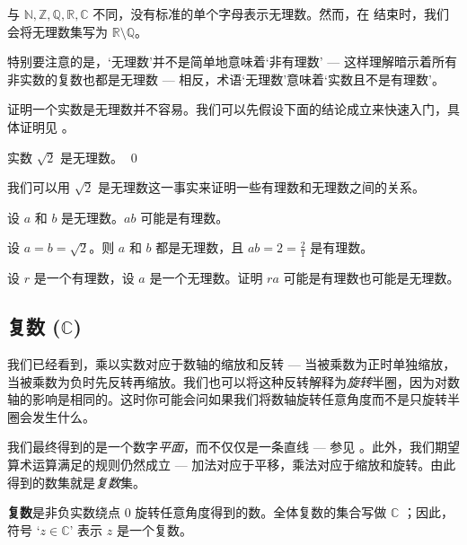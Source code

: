 与 $\mathbb{N},\mathbb{Z},\mathbb{Q},\mathbb{R},\mathbb{C}$ 不同，没有标准的单个字母表示无理数。然而，在  结束时，我们会将无理数集写为 $\mathbb{R} \setminus \mathbb{Q}$。

特别要注意的是，`无理数'并不是简单地意味着`非有理数' --- 这样理解暗示着所有非实数的复数也都是无理数 --- 相反，术语`无理数'意味着`实数且不是有理数'。

证明一个实数是无理数并不容易。我们可以先假设下面的结论成立来快速入门，具体证明见 。

\begin{proposition}
\label{propSqrt2IrrationalPreliminary}
实数 $\sqrt{2}$ 是无理数。 \qed
\end{proposition}

我们可以用 $\sqrt{2}$ 是无理数这一事实来证明一些有理数和无理数之间的关系。

\begin{proposition}
设 $a$ 和 $b$ 是无理数。$ab$ 可能是有理数。
\end{proposition}

\begin{cproof}
设 $a=b=\sqrt{2}$。则 $a$ 和 $b$ 都是无理数，且 $ab=2=\frac{2}{1}$ 是有理数。
\end{cproof}

\begin{exercise}
设 $r$ 是一个有理数，设 $a$ 是一个无理数。证明 $ra$ 可能是有理数也可能是无理数。
\end{exercise}

\subsection*{复数 ($\mathbb{C}$)}

我们已经看到，乘以实数对应于数轴的缩放和反转 --- 当被乘数为正时单独缩放，当被乘数为负时先反转再缩放。我们也可以将这种反转解释为\textit{旋转}半圈，因为对数轴的影响是相同的。这时你可能会问如果我们将数轴旋转任意角度而不是只旋转半圈会发生什么。

我们最终得到的是一个数字\textit{平面}，而不仅仅是一条直线 --- 参见 。此外，我们期望算术运算满足的规则仍然成立 --- 加法对应于平移，乘法对应于缩放和旋转。由此得到的数集就是\textit{复数}集。

\begin{definition}
\label{defComplexNumbersInformal}
\textbf{复数}是非负实数绕点 $0$ 旋转任意角度得到的数。全体复数的集合写做 $\mathbb{C}$ ；因此，符号 `$z \in \mathbb{C}$' 表示 $z$ 是一个复数。
\end{definition}

